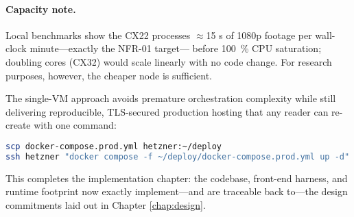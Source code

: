 \paragraph{Capacity note.}
Local benchmarks show the CX22 processes \(\approx\)15 s of 1080p footage per
wall-clock minute—exactly the NFR-01 target—
before \SI{100}{\percent} CPU saturation; doubling cores (CX32) would scale
linearly with no code change.  For research purposes, however, the cheaper
node is sufficient.

\medskip
The single-VM approach avoids premature orchestration complexity while still
delivering reproducible, TLS-secured production hosting that any reader can
re-create with one command:

\begin{lstlisting}[language=bash,basicstyle=\scriptsize\ttfamily]
scp docker-compose.prod.yml hetzner:~/deploy
ssh hetzner "docker compose -f ~/deploy/docker-compose.prod.yml up -d"
\end{lstlisting}

\vspace{1em}
\noindent
This completes the implementation chapter: the codebase, front-end harness,
and runtime footprint now exactly implement—and are traceable back to—the
design commitments laid out in Chapter \ref{chap:design}.

